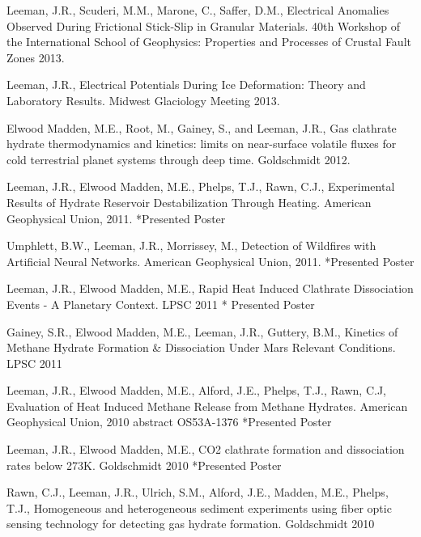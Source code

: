\documentclass[letterpaper]{article}
\renewenvironment{itemize}{
  \begin{list}{}{
    \setlength{\leftmargin}{1.5em}
  }
}{
  \end{list}
}
\begin{document}
\begin{itemize}

\item Leeman, J.R., Scuderi, M.M., Marone, C., Saffer, D.M., Electrical Anomalies Observed During Frictional Stick-Slip in Granular Materials.  40th Workshop of the International School of Geophysics: Properties and Processes of Crustal Fault Zones 2013.

\item Leeman, J.R., Electrical Potentials During Ice Deformation: Theory and Laboratory Results.  Midwest Glaciology Meeting 2013.  

\item Elwood Madden, M.E., Root, M., Gainey, S., and Leeman, J.R., Gas clathrate hydrate thermodynamics and kinetics: limits on near-surface volatile fluxes for cold terrestrial planet systems through deep time.  Goldschmidt 2012.

\item Leeman, J.R., Elwood Madden, M.E., Phelps, T.J., Rawn, C.J.,  Experimental Results of Hydrate Reservoir Destabilization Through Heating. American Geophysical Union, 2011.  *Presented Poster

\item Umphlett, B.W., Leeman, J.R., Morrissey, M.,  Detection of Wildfires with Artificial Neural Networks. American Geophysical Union, 2011.  *Presented Poster

\item Leeman, J.R., Elwood Madden, M.E., Rapid Heat Induced Clathrate Dissociation Events - A Planetary Context. LPSC 2011 * Presented Poster

\item  Gainey, S.R., Elwood Madden, M.E., Leeman, J.R., Guttery, B.M., Kinetics of Methane Hydrate Formation \& Dissociation Under Mars Relevant Conditions. LPSC 2011 

\item Leeman, J.R., Elwood Madden, M.E., Alford, J.E., Phelps, T.J., Rawn, C.J, Evaluation of Heat Induced Methane Release from Methane Hydrates. American Geophysical Union, 2010 abstract OS53A-1376 *Presented Poster

\item Leeman, J.R., Elwood Madden, M.E., CO2 clathrate formation and dissociation rates below 273K. Goldschmidt 2010 *Presented Poster

\item Rawn, C.J., Leeman, J.R., Ulrich, S.M., Alford, J.E., Madden, M.E., Phelps, T.J., Homogeneous and heterogeneous sediment experiments using fiber optic sensing technology for detecting gas hydrate formation. Goldschmidt 2010


\end{itemize}
\end{document}
